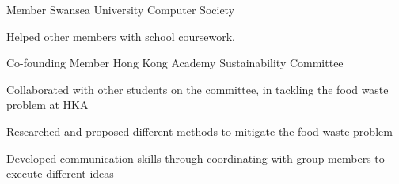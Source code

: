 

\begin{cventries}
    \cventry
        {Member}
        {Swansea University Computer Society}
        {}
        {}
        {
        \begin{cvitems}
            \item{Helped other members with school coursework.}
        \end{cvitems}
        }
        
    \cventry
        {Co-founding Member} %
        {Hong Kong Academy Sustainability Committee} %
        {} %
        {} %
        {
        \begin{cvitems}
            \item{Collaborated with other students on the committee, in tackling the food waste problem at HKA}
            \item{Researched and proposed different methods to mitigate the food waste problem}
            \item{Developed communication skills through coordinating with group members to execute different ideas}
        \end{cvitems}
        }




\end{cventries}
